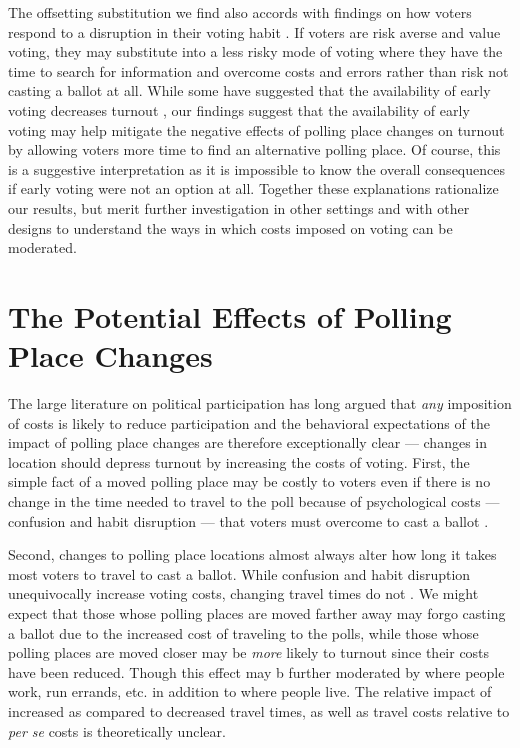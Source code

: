 \documentclass{cup_PSRM}
\begin{document}
The offsetting substitution we find also accords with findings on how voters respond to a disruption in their voting habit \citep{meredith2011convenience}.  If voters are risk averse and value voting, they may substitute into a less risky mode of voting where they have the time to search for information and overcome costs and errors rather than risk not casting a ballot at all.  While some have suggested that the availability of early voting decreases turnout \citep{burden2014early}, our findings suggest that the availability of early voting may help mitigate the negative effects of polling place changes on turnout by allowing voters more time to find an alternative polling place.  Of course, this is a suggestive interpretation as it is impossible to know the overall consequences if early voting were not an option at all.  Together these explanations rationalize our results, but merit further investigation in other settings and with other designs to understand the ways in which costs imposed on voting can be moderated.







\section{The Potential Effects of Polling Place Changes}\label{section_context}

\noindent  The large literature on political participation has long argued that \emph{any} imposition of costs is likely to reduce participation \citep{downs1957, wolfinger1980votes, powell1986american, highton2004voter} and the behavioral expectations of the impact of polling place changes are therefore exceptionally clear --- changes in location should depress turnout by increasing the costs of voting.  First, the simple fact of a moved polling place may be costly to voters even if there is no change in the time needed to travel to the poll because of psychological costs --- confusion and habit disruption --- that voters must overcome to cast a ballot \citep{brady2011turning, amos2017reprecincting}.

Second, changes to polling place locations almost always alter how long it takes most voters to travel to cast a ballot.  While confusion and habit disruption unequivocally increase voting costs, changing travel times do not \citep{brady2011turning, dyck2005distance, gimpel2003political, haspel2005location,cantoni2016, amos2017reprecincting}.  We might expect that those whose polling places are moved farther away may forgo casting a ballot due to the increased cost of traveling to the polls, while those whose polling places are moved closer may be \emph{more} likely to turnout since their costs have been reduced. Though this effect may b further moderated by where people work, run errands, etc. in addition to where people live.  The relative impact of increased as compared to decreased travel times, as well as travel costs relative to \emph{per se} costs is theoretically unclear.
\end{document}
